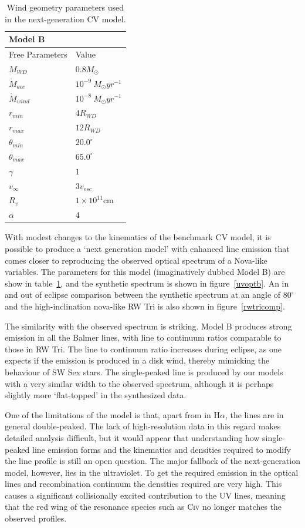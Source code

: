 \documentclass[preprint, a4paper, 11pt]{aastex}
\begin{document}
\begin{table}
\centering
\begin{tabular}{p{3cm}p{4cm}}
Model B \\
\hline Free Parameters 	&	 Value \\ 
\hline \hline 
$M_{WD}$ 	 &	 $0.8 M_{\odot}$ \\ 
$\dot{M}_{acc}$ 	 &	 $10^{-9}~M_{\odot}yr^{-1}$\\ 
$\dot{M}_{wind}$  &	$10^{-8}~M_{\odot}yr^{-1}$\\ 
$r_{min}$ 	&	 $4 R_{WD}$\\ 
$r_{max}$ 	&	 $12 R_{WD}$ \\ 
$\theta_{min}$ 	&	 $20.0^{\circ}$ \\ 
$\theta_{max}$ 	&	 $65.0^{\circ}$ \\ 
$\gamma$ 	&	 $1$ \\ 
$v_{\infty}$ 	&	 $3v_{esc}$ \\ 
$R_v$ 	        &	 $1\times10^{11}$cm \\ 
$\alpha$ 	&	 $4$ \\
\end{tabular}
\centering
\caption{Wind geometry parameters used in the next-generation CV model.}
\label{modelb}
\end{table}

With modest changes to the kinematics of the benchmark CV model,
it is possible to produce a `next generation model' with enhanced
line emission that comes closer to reproducing the observed optical spectrum
of a Nova-like variables. The parameters for this model (imaginatively dubbed Model B)
are show in table~\ref{modelb}, and the synthetic spectrum
is shown in figure~\ref{uvoptb}. An in and out of eclipse comparison 
between the synthetic spectrum
at an angle of $80^\circ$ and the high-inclination nova-like RW Tri 
is also shown in figure~\ref{rwtricomp}.

The similarity with the observed spectrum is striking. 
Model B produces strong emission in all the Balmer lines, 
with line to continuum ratios
comparable to those in RW Tri. 
The line to continuum ratio increases during eclipse,
as one expects if the emission is produced in a disk wind, 
thereby mimicking the behaviour of SW Sex stars.
The single-peaked \ha line is produced by our models with a 
very similar width to the observed spectrum, although it is perhaps slightly more
`flat-topped' in the synthesized data.

One of the limitations of the model is that, apart 
from in H$\alpha$, the lines are in general double-peaked. 
The lack of high-resolution data in this regard makes detailed analysis difficult,
but it would appear that understanding how single-peaked 
line emission forms and the kinematics and densities required to
modify the line profile is still an open question. 
The major fallback of the next-generation model, however, lies
in the ultraviolet. To get the required emission in the optical lines
and recombination continuum the densities required are very high.
This causes a significant collisionally excited contribution
to the UV lines, meaning that the red wing of the 
resonance species such as C\textsc{iv} no longer matches the
observed profiles. 
\end{document}
